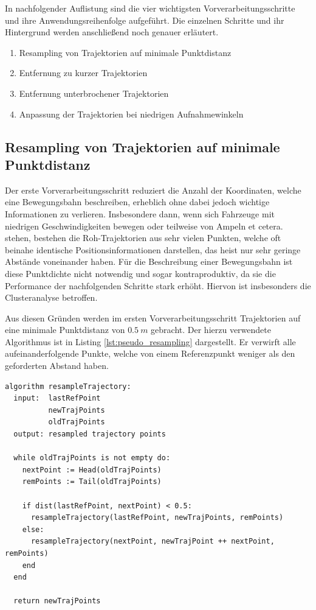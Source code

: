 In nachfolgender Auflistung sind die vier wichtigsten Vorverarbeitungsschritte und ihre Anwendungsreihenfolge
aufgeführt. Die einzelnen Schritte und ihr Hintergrund werden anschließend noch genauer erläutert.

\begin{enumerate}
    \item Resampling von Trajektorien auf minimale Punktdistanz
    \item Entfernung zu kurzer Trajektorien
    \item Entfernung unterbrochener Trajektorien
    \item Anpassung der Trajektorien bei niedrigen Aufnahmewinkeln
\end{enumerate}

\subsection{Resampling von Trajektorien auf minimale Punktdistanz}
Der erste Vorverarbeitungsschritt reduziert die Anzahl der Koordinaten, welche eine Bewegungsbahn beschreiben, erheblich
ohne dabei jedoch wichtige Informationen zu verlieren. Insbesondere dann, wenn sich Fahrzeuge mit niedrigen
Geschwindigkeiten bewegen oder teilweise von Ampeln et cetera. stehen, bestehen die Roh-Trajektorien aus sehr vielen
Punkten, welche oft beinahe identische Positionsinformationen darstellen, das heist nur sehr geringe
Abstände voneinander haben. Für die Beschreibung einer Bewegungsbahn ist diese Punktdichte nicht notwendig
und sogar kontraproduktiv, da sie die Performance der nachfolgenden Schritte stark erhöht. Hiervon ist insbesonders
die Clusteranalyse betroffen.

Aus diesen Gründen werden im ersten Vorverarbeitungsschritt Trajektorien auf eine minimale Punktdistanz
von $0.5\ m$ gebracht. Der hierzu verwendete Algorithmus ist in Listing \ref{lst:pseudo_resampling} dargestellt.
Er verwirft alle aufeinanderfolgende Punkte, welche von einem Referenzpunkt weniger als den geforderten Abstand haben.
\begin{lstlisting}[caption=Pseudocode Trajektorie Resampling, language=Pseudo, label=lst:pseudo_resampling]
algorithm resampleTrajectory:
  input:  lastRefPoint
          newTrajPoints
          oldTrajPoints
  output: resampled trajectory points

  while oldTrajPoints is not empty do:
    nextPoint := Head(oldTrajPoints)
    remPoints := Tail(oldTrajPoints)

    if dist(lastRefPoint, nextPoint) < 0.5:
      resampleTrajectory(lastRefPoint, newTrajPoints, remPoints)
    else:
      resampleTrajectory(nextPoint, newTrajPoint ++ nextPoint, remPoints)
    end
  end

  return newTrajPoints
\end{lstlisting}


